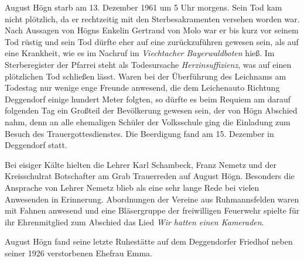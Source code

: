 August Högn starb am 13. Dezember 1961 um 5 Uhr morgens. Sein Tod kam
nicht plötzlich, da er rechtzeitig mit den Sterbesakramenten versehen
worden war. Nach Aussagen von Högns Enkelin Gertraud von Molo war er
bis kurz vor seinem Tod rüstig und sein Tod dürfte eher auf eine
 zurückzuführen gewesen
sein, als auf eine  Krankheit, wie es im
Nachruf im \textit{Viechtacher Bayerwaldboten} hieß. Im Sterberegister
der Pfarrei steht als Todesursache \textit{Herzinsuffizienz}, was auf
einen plötzlichen Tod schließen lässt. Waren bei der Überführung des
Leichnams am Todestag nur wenige enge Freunde anwesend, die dem
Leichenauto Richtung Deggendorf einige hundert Meter folgten, so dürfte
es beim Requiem am darauf folgenden Tag ein Großteil der Bevölkerung
gewesen sein, der von Högn Abschied nahm, denn an alle ehemaligen
Schüler der Volksschule ging die Einladung zum Besuch des
Trauergottesdienstes. Die Beerdigung fand am 15. Dezember in Deggendorf
statt.

Bei eisiger Kälte hielten die Lehrer Karl Schambeck, Franz Nemetz und
der Kreisschulrat Botschafter am Grab Trauerreden auf August Högn.
Besonders die Ansprache von Lehrer Nemetz blieb als eine sehr lange
Rede bei vielen Anwesenden in Erinnerung. Abordnungen der Vereine aus
Ruhmannsfelden waren mit Fahnen anwesend und eine Bläsergruppe der
freiwilligen Feuerwehr spielte für ihr Ehrenmitglied zum Abschied das
Lied \textit{Wir hatten einen Kameraden}.

August Högn fand seine letzte Ruhestätte auf dem Deggendorfer Friedhof
neben seiner 1926 verstorbenen Ehefrau Emma.